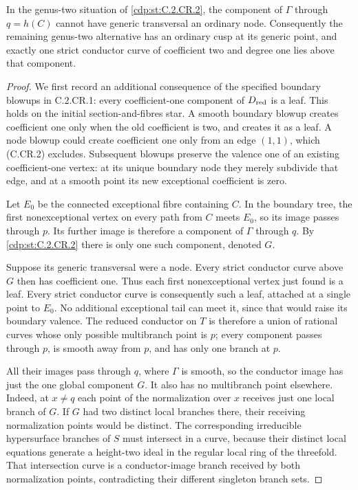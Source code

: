 
\begin{proposition}\label{cdp:st:C.2.CR.3}
In the genus-two situation of \ref{cdp:st:C.2.CR.2}, the component
of $\Gamma$ through $q=h(C)$ cannot have generic
transversal an ordinary node. Consequently the
remaining genus-two alternative has an ordinary cusp
at its generic point, and exactly one strict conductor
curve of coefficient two and degree one lies above
that component.
\end{proposition}
\begin{proof}
We first record an additional consequence of the
specified boundary blowups in C.2.CR.1: every
coefficient-one component of $D_{\rm red}$ is a leaf.
This holds on the initial section-and-fibres star.
A smooth boundary blowup creates coefficient one
only when the old coefficient is two, and creates
it as a leaf. A node blowup could create coefficient
one only from an edge $(1,1)$, which (C.CR.2)
excludes. Subsequent blowups preserve the valence
one of an existing coefficient-one vertex: at its
unique boundary node they merely subdivide that edge,
and at a smooth point its new exceptional coefficient
is zero.

Let $E_0$ be the connected exceptional fibre containing
$C$. In the boundary tree, the first nonexceptional
vertex on every path from $C$ meets $E_0$, so its image
passes through $p$. Its further image is therefore
a component of $\Gamma$ through $q$. By \ref{cdp:st:C.2.CR.2}
there is only one such component, denoted $G$.

Suppose its generic transversal were a node.
Every strict conductor curve above $G$ then has
coefficient one. Thus each first nonexceptional
vertex just found is a leaf. Every strict conductor
curve is consequently such a leaf, attached at a
single point to $E_0$. No additional exceptional
tail can meet it, since that would raise its
boundary valence. The reduced conductor on $T$
is therefore a union of rational curves whose only
possible multibranch point is $p$; every component
passes through $p$, is smooth away from $p$, and
has only one branch at $p$.

All their images pass through $q$, where $\Gamma$
is smooth, so the conductor image has just the one
global component $G$. It also has no multibranch
point elsewhere. Indeed, at $x\ne q$ each point
of the normalization over $x$ receives just one
local branch of $G$. If $G$ had two distinct local
branches there, their receiving normalization
points would be distinct. The corresponding
irreducible hypersurface branches of $S$ must
intersect in a curve, because their distinct
local equations generate a height-two ideal in
the regular local ring of the threefold. That
intersection curve is a conductor-image branch
received by both normalization points, contradicting
their different singleton branch sets.


\end{proof}
